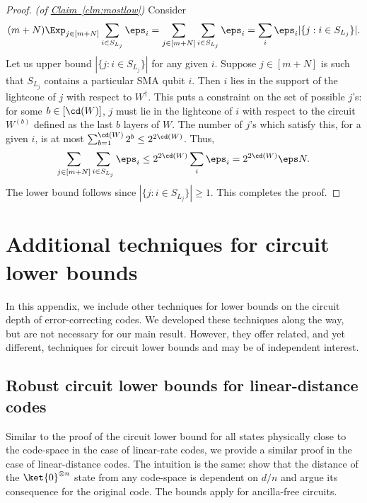 \documentclass[11pt]{article}
\newcommand{\expref}[2]{\texorpdfstring{\hyperref[#2]{#1~\ref{#2}}}{#1~\ref{#2}}}
\begin{document}
\begin{proof}\textit{(of \expref{Claim}{clm:mostlow})}
Consider
\begin{align}(m+N)\Exp_{j\in [m+N]}\sum_{i\in S_{L_j}}\eps_i=\sum_{j\in [m+N]}\sum_{i\in S_{L_j}}\eps_i=\sum_{i}\eps_i|\{j:i\in S_{L_j}\}|.\end{align}
Let us upper bound $|\{j:i\in S_{L_j}\}|$ for any given $i$. Suppose $j\in [m+N]$ is such that $S_{L_j}$ contains a particular SMA qubit $i$. Then $i$ lies in the support of the lightcone of $j$ with respect to $W^{\dagger}$. This puts a constraint on the set of possible $j$'s: for some $b \in [\cd(W)]$, $j$ must lie in the lightcone of $i$ with respect to the circuit $W^{(b)}$ defined as the last $b$ layers of $W$. The number of $j$'s which satisfy this, for a given $i$, is at most $\sum_{b=1}^{\cd(W)}2^{b}\leq 2^{2\cd(W)}$. Thus, 
\begin{align}\sum_{j\in [m+N]}\sum_{i\in S_{L_j}}\eps_i\leq 2^{2\cd(W)}\sum_{i}\eps_i=2^{2\cd(W)}\eps N.\end{align}
The lower bound follows since $|\{j:i\in S_{L_j}\}|\geq 1$. This completes the proof.
\end{proof}

%

\appendix

\section{Additional techniques for circuit lower bounds}
\label{sec:other-techniques}

In this appendix, we include other techniques for lower bounds on the circuit depth of error-correcting codes. We developed these techniques along the way, but are not necessary for our main result. However, they offer related, and yet different, techniques for circuit lower bounds and may be of independent interest.

\subsection{Robust circuit lower bounds for linear-distance codes}

%

Similar to the proof of the circuit lower bound for all states physically close to the code-space in the case of linear-rate codes, we provide a similar proof in the case of linear-distance codes. The intuition is the same: show that the distance of the $\ket{0}^{\otimes n}$ state from any code-space is dependent on $d/n$ and argue its consequence for the original code. The bounds apply for ancilla-free circuits.
%
\end{document}
